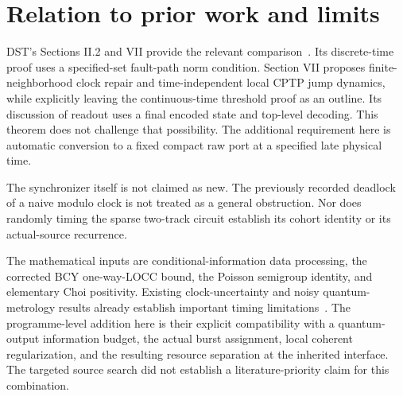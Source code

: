 \documentclass[11pt]{article}
\begin{document}
\section{Relation to prior work and limits}

DST's Sections II.2 and VII provide the relevant comparison~\cite{DST}.
Its discrete-time proof uses a specified-set fault-path norm condition.
Section VII proposes finite-neighborhood clock repair and
time-independent local CPTP jump dynamics, while explicitly leaving the
continuous-time threshold proof as an outline. Its discussion of
readout uses a final encoded state and top-level decoding. This theorem
does not challenge that possibility. The additional requirement here is
automatic conversion to a fixed compact raw port at a specified late
physical time.

The synchronizer itself is not claimed as new. The previously recorded
deadlock of a naive modulo clock is not treated as a general obstruction.
Nor does randomly timing the sparse two-track circuit establish its
cohort identity or its actual-source recurrence.

The mathematical inputs are conditional-information data processing,
the corrected BCY one-way-LOCC bound, the Poisson semigroup identity,
and elementary Choi positivity. Existing clock-uncertainty and noisy
quantum-metrology results already establish important timing
limitations~\cite{Clock,Metrology}. The programme-level addition here is
their explicit compatibility with a quantum-output information budget,
the actual burst assignment, local coherent regularization, and the
resulting resource separation at the inherited interface.
The targeted source search did not establish a literature-priority
claim for this combination.
\end{document}
